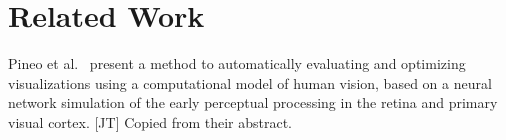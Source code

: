 \section{Related Work}
\cite{linegraph_vs_scatterplot} \cite{cleveland_mcgill}

Pineo et al.~\cite{Pineo2012} present a method to automatically evaluating and optimizing visualizations using a computational model of human vision, based on a neural network simulation of the early perceptual processing in the retina and primary visual cortex. [JT] Copied from their abstract.


